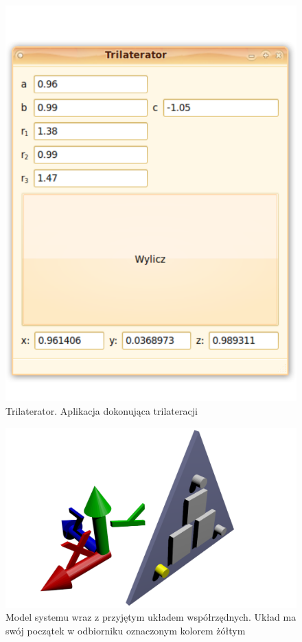 \begin{figure}[p]
 \includegraphics[width=\textwidth]{gfx/trilaterator.pdf}
 \caption{Trilaterator. Aplikacja dokonująca trilateracji}
 \label{fig:trilaterator}
\end{figure}

\begin{figure}[p]
 \includegraphics[width=\textwidth]{gfx/uklad_render.png}
 \caption[Model systemu i przyjęty układ współrzędnych]{Model systemu wraz z przyjętym układem współrzędnych. Układ ma swój początek w odbiorniku oznaczonym kolorem żółtym}
 \label{fig:coordinate_system}
\end{figure}

